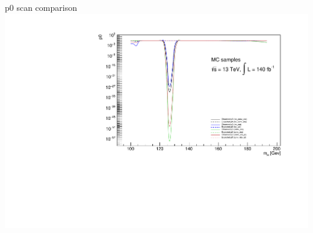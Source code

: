 \documentclass[10pt,UKenglish, leqno, xcolor = dvipsnames]{beamer}
\begin{document}
		\begin{frame}{p0 scan comparison}
			\vfill
			\centering
			\includegraphics[width=.95\textwidth]{../images/week_13/p0_plot_comp.pdf}	
			\vfill
		\end{frame}
	
\end{document}
